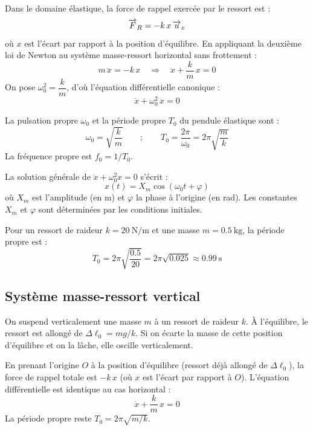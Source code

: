 \begin{loi}
Dans le domaine élastique, la force de rappel exercée par le ressort est :
\[
\overrightarrow{F}_R = -k\,x\,\overrightarrow{u}_x
\]
où $x$ est l'écart par rapport à la position d'équilibre. En appliquant la deuxième loi de Newton au système masse-ressort horizontal sans frottement :
\[
m\,\ddot{x} = -k\,x \quad\Longrightarrow\quad \ddot{x} + \frac{k}{m}\,x = 0
\]
On pose $\omega_0^2 = \dfrac{k}{m}$, d'où l'équation différentielle canonique :
\[
\boxed{\ddot{x} + \omega_0^2\,x = 0}
\]
\end{loi}

\begin{definition}
La pulsation propre $\omega_0$ et la période propre $T_0$ du pendule élastique sont :
\[
\omega_0 = \sqrt{\frac{k}{m}} \qquad ; \qquad T_0 = \frac{2\pi}{\omega_0} = 2\pi\sqrt{\frac{m}{k}}
\]
La fréquence propre est $f_0 = 1/T_0$.
\end{definition}

\begin{propriete}
La solution générale de $\ddot{x} + \omega_0^2 x = 0$ s'écrit :
\[
x(t) = X_m\cos(\omega_0 t + \varphi)
\]
où $X_m$ est l'amplitude (en \si{\metre}) et $\varphi$ la phase à l'origine (en \si{\radian}). Les constantes $X_m$ et $\varphi$ sont déterminées par les conditions initiales.
\end{propriete}

\begin{exemple}
Pour un ressort de raideur $k = \SI{20}{\newton\per\metre}$ et une masse $m = \SI{0.5}{\kilogram}$, la période propre est :
\[
T_0 = 2\pi\sqrt{\frac{0.5}{20}} = 2\pi\sqrt{0.025} \approx \SI{0.99}{\second}
\]
\end{exemple}

\subsection{Système masse-ressort vertical}

\begin{experience}
On suspend verticalement une masse $m$ à un ressort de raideur $k$. À l'équilibre, le ressort est allongé de $\Delta\ell_0 = mg/k$. Si on écarte la masse de cette position d'équilibre et on la lâche, elle oscille verticalement.
\end{experience}

\begin{loi}
En prenant l'origine $O$ à la position d'équilibre (ressort déjà allongé de $\Delta\ell_0$), la force de rappel totale est $-k\,x$ (où $x$ est l'écart par rapport à $O$). L'équation différentielle est identique au cas horizontal :
\[
\ddot{x} + \frac{k}{m}\,x = 0
\]
La période propre reste $T_0 = 2\pi\sqrt{m/k}$.
\end{loi}


